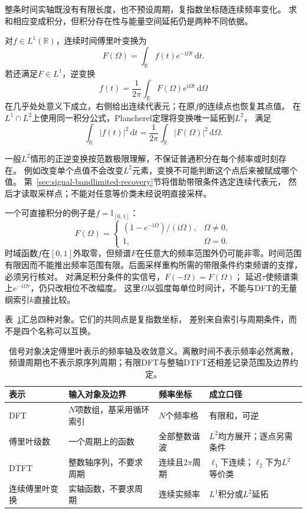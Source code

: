 整条时间实轴既没有有限长度，也不预设周期，复指数坐标随连续频率变化。
求和相应变成积分，但积分存在性与能量空间延拓仍是两种不同依据。
\begin{definition}[连续时间傅里叶变换]
  \label{def:signal-analysis-continuous-fourier-transform}
  对$f\in L^1(\mathbb R)$，连续时间傅里叶变换为
  \[
    F(\Omega)=\int_{\mathbb R}f(t)e^{-\mathrm i\Omega t}\,\mathrm dt.
  \]
  若还满足$F\in L^1$，逆变换
  \[
    f(t)=\frac1{2\pi}\int_{\mathbb R}F(\Omega)e^{\mathrm i\Omega t}\,\mathrm d\Omega
  \]
  在几乎处处意义下成立，右侧给出连续代表元；在原$f$的连续点也恢复其点值。
  在$L^1\cap L^2$上使用同一积分公式，Plancherel定理将变换唯一延拓到$L^2$，
  满足
  \[
    \int_{\mathbb R}|f(t)|^2\,\mathrm dt
    =\frac1{2\pi}\int_{\mathbb R}|F(\Omega)|^2\,\mathrm d\Omega.
  \]
\end{definition}
一般$L^2$情形的正逆变换按范数极限理解，不保证普通积分在每个频率或时刻存在。
例如改变单个点值不会改变$L^2$元素，变换不可能判断这个点后来被赋成哪个值。
第~\ref{sec:signal-bandlimited-recovery}节将借助带限条件选定连续代表元，
然后才读取采样点；不能对任意等价类未经说明直接采样。

一个可直接积分的例子是$f=\mathbb I_{[0,1]}$：
\[
  F(\Omega)=
  \begin{cases}
    (1-e^{-\mathrm i\Omega})/(\mathrm i\Omega),&\Omega\neq0,\\
    1,&\Omega=0.
  \end{cases}
\]
时域函数$f$在$[0,1]$外取零，但频谱$F$在任意大的频率范围外仍可能非零。时间范围
有限因而不能推出频率范围有限。后面采样重构所需的带限条件约束频谱的支撑，
必须另行核对。
对满足积分条件的实信号，$F(-\Omega)=\overline{F(\Omega)}$；
延迟$\tau$使频谱乘上$e^{-\mathrm i\Omega\tau}$，仍只改相位不改幅度。
这里$\Omega$以弧度每单位时间计，不能与DFT的无量纲索引$k$直接比较。

表~\ref{tab:reader-fourier-objects}汇总四种对象。它们的共同点是复指数坐标，
差别来自索引与周期条件，而不是四个名称可以互换。
\begin{table}[htbp]
  \centering
  \begin{tabularx}{\linewidth}{lXXX}
    \toprule
    表示 & 输入对象及边界 & 频率坐标 & 成立口径\\
    \midrule
    DFT & $N$项数组，基采用循环索引 & $N$个频率格 & 有限和，可逆\\
    傅里叶级数 & 一个周期上的函数 & 全部整数谐波 & $L^2$均方展开；逐点另需条件\\
    DTFT & 整数轴序列，不要求周期 & 连续且$2\pi$周期 & $\ell_1$下连续；$\ell_2$下为$L^2$等价类\\
    连续傅里叶变换 & 实轴函数，不要求周期 & 连续实频率 & $L^1$积分或$L^2$延拓\\
    \bottomrule
  \end{tabularx}
  \caption{信号对象决定傅里叶表示的频率轴及收敛意义。离散时间不表示频率必然离散，
  频谱周期也不表示原序列周期；有限DFT与整轴DTFT还相差记录范围及边界约定。}
  \label{tab:reader-fourier-objects}
\end{table}

